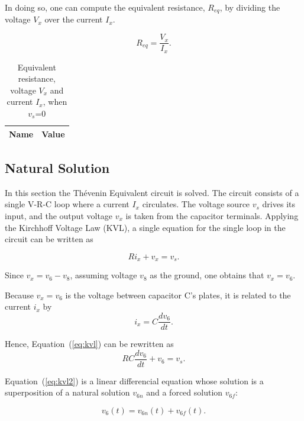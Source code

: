In doing so, one can compute the equivalent resistance, $R_{eq}$, by dividing the
voltage $V_x$ over the current $I_x$.

\begin{equation}
  R_{eq} = \frac{V_x}{I_x}.
  \label{eq:R_eq}
\end{equation}

\begin{table} [H]
  \centering
  \begin{tabular}{|l|r|}
    \hline    
    {\bf Name} & {\bf Value} \\ \hline
    
  \end{tabular}
  \caption{Equivalent resistance, voltage $V_x$ and current $I_x$, when $v_s$=0}
  \label{tab:req}
\end{table}



\subsection{Natural Solution}
In this section the Thévenin Equivalent circuit is solved.
The circuit consists of a single V-R-C loop where a current $I_{x}$ circulates. The
voltage source $v_s$ drives its input, and the output voltage $v_x$ is taken from
the capacitor terminals. Applying the Kirchhoff Voltage Law (KVL), a single
equation for the single loop in the circuit can be written as

\begin{equation}
  Ri_{x} + v_{x} = v_{s}.
  \label{eq:kvl}
\end{equation}

Since $v_{x}=v_{6}-v_{8}$, assuming voltage $v_8$ as the ground, one obtains that $v_{x}=v_{6}$.

Because $v_{x}=v_{6}$ is the voltage between capacitor C's plates, it is related to the
current $i_x$ by
\begin{equation}
  i_{x} = C\frac{dv_6}{dt}.
\end{equation}

Hence, Equation~(\ref{eq:kvl}) can be rewritten as
\begin{equation}
  RC\frac{dv_6}{dt} + v_6 = v_s.
  \label{eq:kvl2}
\end{equation}

Equation~(\ref{eq:kvl2}) is a linear differencial equation whose solution is a
superposition of a natural solution $v_{6n}$ and a forced solution $v_{6f}$:

\begin{equation}
  v_6(t) = v_{6n}(t) + v_{6f}(t).
  \label{eq:v6_sol}
\end{equation}

